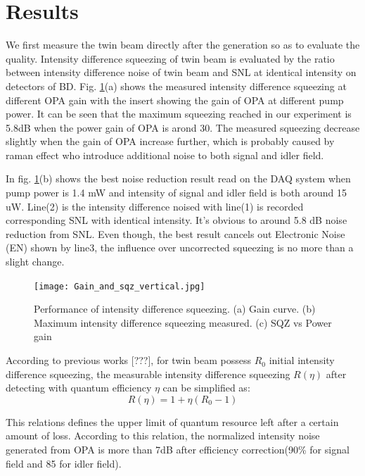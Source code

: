 \documentclass[9pt,twocolumn,twoside]{osajnl}
\begin{document}
\section{Results}

We first measure the twin beam directly after the generation so as to evaluate the quality.
Intensity difference squeezing of twin beam is evaluated by the ratio between intensity difference noise of twin beam and SNL at identical intensity on detectors of BD.
Fig. \ref{fig2_OPA}(a) shows the measured intensity difference squeezing at different OPA gain with the insert showing the gain of OPA at different pump power.
It can be seen that the maximum squeezing reached in our experiment is 5.8dB when the power gain of OPA is arond 30.
The measured squeezing decrease slightly when the gain of OPA increase further, which is probably caused by raman effect who introduce additional noise to both signal and idler field.

In fig. \ref{fig2_OPA}(b) shows the best noise reduction result read on the DAQ system when pump power is 1.4 mW and intensity of signal and idler field is both around 15 uW. Line(2) is the intensity difference noised with line(1) is recorded corresponding SNL with identical intensity. It's obvious to around 5.8 dB noise reduction from SNL. Even though, the best result cancels out Electronic Noise (EN) shown by line3, the influence over uncorrected squeezing is no more than a slight change.

\begin{figure}[htbp]
\centering
\texttt{[image: Gain\_and\_sqz\_vertical.jpg]}%
\caption{Performance of intensity difference squeezing. (a) Gain curve. (b) Maximum intensity difference squeezing measured. (c) SQZ vs Power gain}
\label{fig2_OPA}
\end{figure}

According to previous works [???], for twin beam possess $R_0$ initial intensity difference squeezing, the measurable intensity difference squeezing $ R(\eta)$ after detecting with quantum efficiency $\eta$ can be simplified as:
\begin{equation}
R(\eta) = 1+\eta(R_0-1)
\label{eq:loss}
\end{equation}

This relations defines the upper limit of quantum resource left after a certain amount of loss. According to this relation, the normalized intensity noise generated from OPA is more than 7dB after efficiency correction(90\% for signal field and 85 for idler field).	
\end{document}
